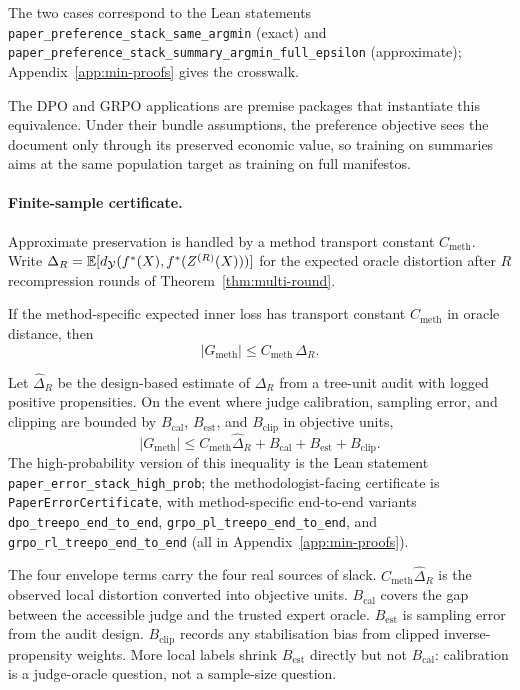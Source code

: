 The two cases correspond to the Lean statements
\texttt{paper\_preference\_stack\_same\_argmin} (exact) and
\texttt{paper\_preference\_stack\_summary\_argmin\_full\_epsilon}
(approximate); Appendix~\ref{app:min-proofs} gives the crosswalk.

The DPO and GRPO applications are premise packages that instantiate
this equivalence. Under their bundle assumptions, the preference
objective sees the document only through its preserved economic value,
so training on summaries aims at the same population target as
training on full manifestos.

\paragraph{Finite-sample certificate.}
Approximate preservation is handled by a method transport constant
$C_{\mathrm{meth}}$. Write
$\Delta_R = \mathbb{E}[d_{\mathcal{Y}}(f^\ast(X),f^\ast(Z^{(R)}(X)))]$
for the expected oracle distortion after $R$ recompression rounds of
Theorem~\ref{thm:multi-round}.

\begin{theorem}\label{thm:unified-gap}
If the method-specific expected inner loss has transport constant
$C_{\mathrm{meth}}$ in oracle distance, then
\[
    |G_{\mathrm{meth}}| \le C_{\mathrm{meth}}\,\Delta_R.
\]
\end{theorem}

\begin{theorem}\label{thm:e2e}
Let $\hat\Delta_R$ be the design-based estimate of $\Delta_R$ from a
tree-unit audit with logged positive propensities. On the event where
judge calibration, sampling error, and clipping are bounded by
$B_{\mathrm{cal}}$, $B_{\mathrm{est}}$, and $B_{\mathrm{clip}}$ in
objective units,
\[
    |G_{\mathrm{meth}}|
    \le
    C_{\mathrm{meth}}\hat{\Delta}_R + B_{\mathrm{cal}}
    + B_{\mathrm{est}} + B_{\mathrm{clip}}.
\]
The high-probability version of this inequality is the Lean statement
\texttt{paper\_error\_stack\_high\_prob}; the methodologist-facing
certificate is \texttt{PaperErrorCertificate}, with method-specific
end-to-end variants \texttt{dpo\_treepo\_end\_to\_end},
\texttt{grpo\_pl\_treepo\_end\_to\_end}, and
\texttt{grpo\_rl\_treepo\_end\_to\_end} (all in
Appendix~\ref{app:min-proofs}).
\end{theorem}

The four envelope terms carry the four real sources of slack.
$C_{\mathrm{meth}}\hat\Delta_R$ is the observed local distortion
converted into objective units. $B_{\mathrm{cal}}$ covers the gap
between the accessible judge and the trusted expert oracle.
$B_{\mathrm{est}}$ is sampling error from the audit design.
$B_{\mathrm{clip}}$ records any stabilisation bias from clipped
inverse-propensity weights. More local labels shrink
$B_{\mathrm{est}}$ directly but not $B_{\mathrm{cal}}$: calibration is
a judge-oracle question, not a sample-size question.

